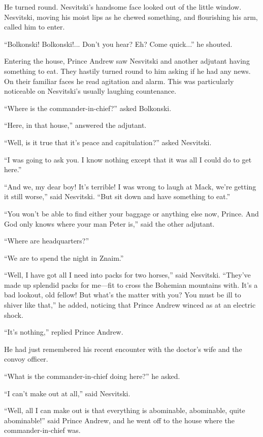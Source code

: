 He turned round. Nesvitski's handsome face looked out of the
little window. Nesvitski, moving his moist lips as he chewed
something, and flourishing his arm, called him to enter.

``Bolkonski! Bolkonski!... Don't you hear? Eh? Come quick...'' he
shouted.

Entering the house, Prince Andrew saw Nesvitski and another
adjutant having something to eat. They hastily turned round to
him asking if he had any news. On their familiar faces he read
agitation and alarm. This was particularly noticeable on
Nesvitski's usually laughing countenance.

``Where is the commander-in-chief?'' asked Bolkonski.

``Here, in that house,'' answered the adjutant.

``Well, is it true that it's peace and capitulation?'' asked
Nesvitski.

``I was going to ask you. I know nothing except that it was all I
could do to get here.''

``And we, my dear boy! It's terrible! I was wrong to laugh at
Mack, we're getting it still worse,'' said Nesvitski. ``But sit
down and have something to eat.''

``You won't be able to find either your baggage or anything else
now, Prince. And God only knows where your man Peter is,'' said
the other adjutant.

``Where are headquarters?''

``We are to spend the night in Znaim.''

``Well, I have got all I need into packs for two horses,'' said
Nesvitski.  ``They've made up splendid packs for me---fit to
cross the Bohemian mountains with. It's a bad lookout, old
fellow! But what's the matter with you? You must be ill to shiver
like that,'' he added, noticing that Prince Andrew winced as at
an electric shock.

``It's nothing,'' replied Prince Andrew.

He had just remembered his recent encounter with the doctor's
wife and the convoy officer.

``What is the commander-in-chief doing here?'' he asked.

``I can't make out at all,'' said Nesvitski.

``Well, all I can make out is that everything is abominable,
abominable, quite abominable!'' said Prince Andrew, and he went
off to the house where the commander-in-chief was.

